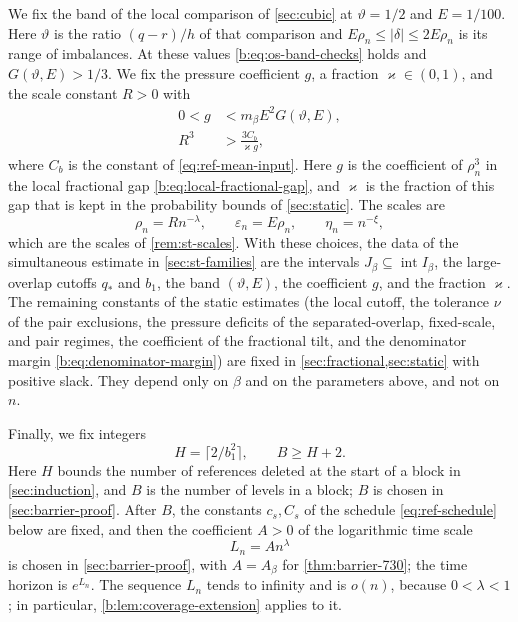 We fix the band of the local comparison of \cref{sec:cubic} at
$\vartheta=1/2$ and $E=1/100$. Here $\vartheta$ is the ratio $(q-r)/h$ of
that comparison and $E\rho_n\le|\delta|\le2E\rho_n$ is its range of
imbalances. At these values \eqref{b:eq:os-band-checks} holds and
$G(\vartheta,E)>1/3$. We fix the pressure coefficient $g$, a fraction
$\varkappa\in(0,1)$, and the scale constant $R>0$ with
\begin{align}
 0<g&<m_\beta E^2G(\vartheta,E),\label{b:dyn:finite-band-g}\\
 R^3&>\frac{3C_b}{\varkappa g},\label{b:dyn:R-condition}
\end{align}
where $C_b$ is the constant of \eqref{eq:ref-mean-input}. Here $g$ is the
coefficient of $\rho_n^3$ in the local fractional gap
\eqref{b:eq:local-fractional-gap}, and $\varkappa$ is the fraction of this gap that
is kept in the probability bounds of \cref{sec:static}. The scales are
\begin{equation}\label{b:dyn:scales}
 \rho_n=Rn^{-\lambda},\qquad \varepsilon_n=E\rho_n,\qquad
 \eta_n=n^{-\xi},
\end{equation}
which are the scales of \cref{rem:st-scales}. With these choices, the data
of the simultaneous estimate in \cref{sec:st-families} are the intervals
$J_\beta\subseteq\operatorname{int}I_\beta$, the large-overlap cutoffs
$q_*$ and $b_1$, the band $(\vartheta,E)$, the coefficient $g$, and the
fraction $\varkappa$. The remaining constants of the static estimates (the local
cutoff, the tolerance $\nu$ of the pair exclusions, the pressure deficits of
the separated-overlap, fixed-scale, and pair regimes, the coefficient of the
fractional tilt, and the denominator margin \eqref{b:eq:denominator-margin})
are fixed in \cref{sec:fractional,sec:static} with positive slack. They
depend only on $\beta$ and on the parameters above, and not on $n$.

Finally, we fix integers
\begin{equation}\label{b:dyn:BH}
 H=\lceil2/b_1^2\rceil,\qquad B\ge H+2 .
\end{equation}
Here $H$ bounds the number of references deleted at the start of a block in
\cref{sec:induction}, and $B$ is the number of levels in a block; $B$ is
chosen in \cref{sec:barrier-proof}. After $B$, the constants
$c_s,C_s$ of the schedule \eqref{eq:ref-schedule} below are fixed, and then
the coefficient $A>0$ of the logarithmic time scale
\[
 L_n=An^\lambda
\]
is chosen in \cref{sec:barrier-proof}, with $A=A_\beta$ for \cref{thm:barrier-730}; the time horizon is $e^{L_n}$. The sequence $L_n$ tends to infinity
and is $o(n)$, because $0<\lambda<1$; in particular,
\cref{b:lem:coverage-extension} applies to it.

